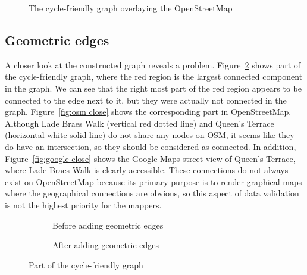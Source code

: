 \documentclass[12pt,a4paper]{report}
\begin{document}
\begin{figure}[ht]
    \centering
     {
        
    }
    \caption{The cycle-friendly graph overlaying the OpenStreetMap}
    \label{fig:graph layout}
\end{figure}

\subsection{Geometric edges}
A closer look at the constructed graph reveals a problem. Figure~\ref{fig:close before} shows part of the cycle-friendly graph, where the red region is the largest connected component in the graph. We can see that the right most part of the red region appears to be connected to the edge next to it, but they were actually not connected in the graph. Figure~\ref{fig:osm close} shows the corresponding part in OpenStreetMap. Although Lade Braes Walk (vertical red dotted line) and Queen's Terrace (horizontal white solid line) do not share any nodes on OSM, it seems like they do have an intersection, so they should be considered as connected. In addition, Figure~\ref{fig:google close} shows the Google Maps street view of Queen's Terrace, where Lade Braes Walk is clearly accessible. These connections do not always exist on OpenStreetMap because its primary purpose is to render graphical maps where the geographical connections are obvious, so this aspect of data validation is not the highest priority for the mappers.

\begin{figure}[ht]
    \centering
    \begin{subfigure}[ht]{\textwidth}
        \centering
         {
            
        }
        \caption{Before adding geometric edges}
        \label{fig:close before}
    \end{subfigure}
    \hfill
    \begin{subfigure}[ht]{\textwidth}
        \centering
         {
            
        }
        \caption{After adding geometric edges}
        \label{fig:close after}
    \end{subfigure}
       \caption{Part of the cycle-friendly graph}
       \label{fig:close example}
\end{figure}
\end{document}
